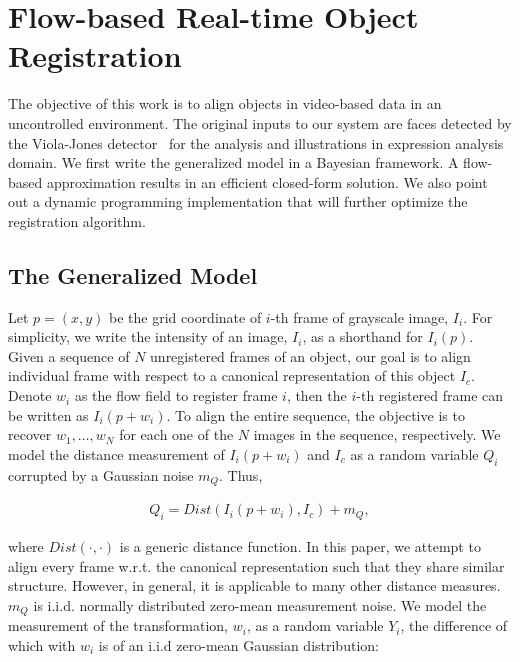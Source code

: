 \documentclass[10pt,journal]{IEEEtran}
\begin{document}
\section{\label{sec:approach}Flow-based Real-time Object Registration}

The objective of this work is to align objects in video-based data in an uncontrolled environment. The original inputs to our system are faces detected by the Viola-Jones detector~\cite{Viola_IJCV04} for the analysis and illustrations in expression analysis domain. We first write the generalized model in a Bayesian framework. A flow-based approximation results in an efficient closed-form solution. We also point out a dynamic programming implementation that will further optimize the registration algorithm.

\subsection{\label{sec:model}The Generalized Model}

Let $p=(x,y)$ be the grid coordinate of $i$-th frame of grayscale image, $I_i$. For simplicity, we write the intensity of an image, $I_i$, as a shorthand for $I_i(p)$. Given a sequence of $N$ unregistered frames of an object, our goal is to align individual frame with respect to a canonical representation of this object $I_c$. Denote $w_i$ as the flow field to register frame $i$, then the $i$-th registered frame can be written as $I_i(p+w_i)$. To align the entire sequence, the objective is to recover $w_1,\ldots,w_N$ for each one of the $N$ images in the sequence, respectively.  We model the distance measurement of $I_i(p+w_i)$ and $I_c$ as a random variable $Q_i$ corrupted by a Gaussian noise $m_Q$. Thus,

\begin{align}
\label{model:measurement}
Q_i=Dist(I_i(p+w_i),I_c)+m_Q,
\end{align}

\noindent where $Dist(\cdot,\cdot)$ is a generic distance function. In this paper, we attempt to align every frame w.r.t. the canonical representation such that they share similar structure. However, in general, it is applicable to many other distance measures. $m_Q$ is i.i.d. normally distributed zero-mean measurement noise. We model the measurement of the transformation, $w_i$, as a random variable $Y_i$, the difference of which with $w_i$ is of an i.i.d zero-mean Gaussian distribution:
\end{document}
